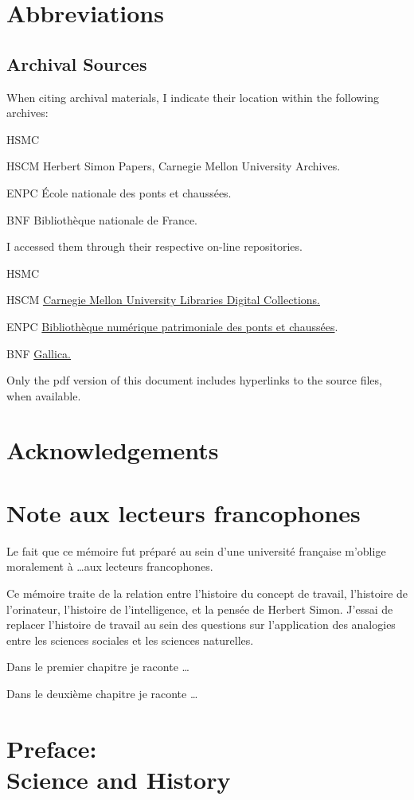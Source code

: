 \frontmatter
\pagestyle{plain}
\chapter*{Abbreviations} 
\section*{Archival Sources}

When citing archival materials, I indicate their location within the
following archives:

\begin{labeling}[:]{HSMC} 
\item[HSCM] Herbert Simon Papers, Carnegie Mellon University Archives.
\item[ENPC] École nationale des ponts et chaussées.
\item[BNF] Bibliothèque nationale de France. 
\end{labeling}

I accessed them through their respective on-line repositories.

\begin{labeling}[:]{HSMC} 
\item[HSCM] \href{https://digitalcollections.library.cmu.edu/portal/index.jsp}{Carnegie Mellon University Libraries Digital Collections.} 
\item[ENPC] \href{https://patrimoine.enpc.fr/}{Bibliothèque numérique patrimoniale des ponts et chaussées}.
\item[BNF] \href{https://gallica.bnf.fr/}{Gallica.}
\end{labeling}

Only the pdf version of this document includes hyperlinks to the source
files, when available.

\chapter{Acknowledgements} 
\lipsum
\chapter{Note aux lecteurs francophones} 
Le fait que ce mémoire fut préparé au sein d'une université française
m'oblige moralement à \ldots aux lecteurs francophones. 

Ce mémoire traite de la relation entre l'histoire du concept de travail,
l'histoire de l'orinateur, l'histoire de l'intelligence, et la pensée de
Herbert Simon. J'essai de replacer l'histoire de travail au sein des
questions sur  l'application des analogies entre les sciences sociales et
les sciences naturelles.  

Dans le premier chapitre je raconte \ldots 

Dans le deuxième chapitre je raconte \ldots 

\lipsum

\chapter[Preface]{Preface:\\ Science and History} 

\lipsum
\mainmatter
\pagestyle{scrheadings}